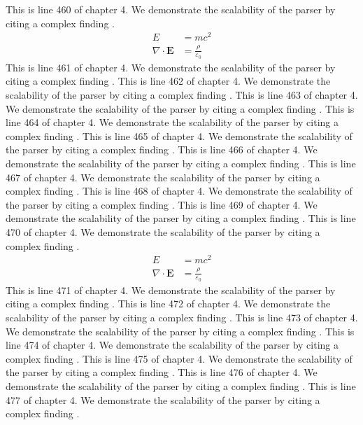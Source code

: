 This is line 460 of chapter 4. We demonstrate the scalability of the parser by citing a complex finding \cite{ref4_460}.
\begin{align*}
  E &= mc^2 \\
  \nabla \cdot \mathbf{E} &= \frac{\rho}{\varepsilon_0}
\end{align*}
This is line 461 of chapter 4. We demonstrate the scalability of the parser by citing a complex finding \cite{ref4_461}.
This is line 462 of chapter 4. We demonstrate the scalability of the parser by citing a complex finding \cite{ref4_462}.
This is line 463 of chapter 4. We demonstrate the scalability of the parser by citing a complex finding \cite{ref4_463}.
This is line 464 of chapter 4. We demonstrate the scalability of the parser by citing a complex finding \cite{ref4_464}.
This is line 465 of chapter 4. We demonstrate the scalability of the parser by citing a complex finding \cite{ref4_465}.
This is line 466 of chapter 4. We demonstrate the scalability of the parser by citing a complex finding \cite{ref4_466}.
This is line 467 of chapter 4. We demonstrate the scalability of the parser by citing a complex finding \cite{ref4_467}.
This is line 468 of chapter 4. We demonstrate the scalability of the parser by citing a complex finding \cite{ref4_468}.
This is line 469 of chapter 4. We demonstrate the scalability of the parser by citing a complex finding \cite{ref4_469}.
This is line 470 of chapter 4. We demonstrate the scalability of the parser by citing a complex finding \cite{ref4_470}.
\begin{align*}
  E &= mc^2 \\
  \nabla \cdot \mathbf{E} &= \frac{\rho}{\varepsilon_0}
\end{align*}
This is line 471 of chapter 4. We demonstrate the scalability of the parser by citing a complex finding \cite{ref4_471}.
This is line 472 of chapter 4. We demonstrate the scalability of the parser by citing a complex finding \cite{ref4_472}.
This is line 473 of chapter 4. We demonstrate the scalability of the parser by citing a complex finding \cite{ref4_473}.
This is line 474 of chapter 4. We demonstrate the scalability of the parser by citing a complex finding \cite{ref4_474}.
This is line 475 of chapter 4. We demonstrate the scalability of the parser by citing a complex finding \cite{ref4_475}.
This is line 476 of chapter 4. We demonstrate the scalability of the parser by citing a complex finding \cite{ref4_476}.
This is line 477 of chapter 4. We demonstrate the scalability of the parser by citing a complex finding \cite{ref4_477}.

